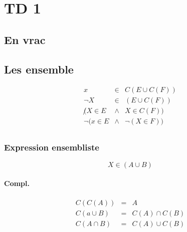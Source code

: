 \documentclass[12pt,a4paper,openany]{report}
\begin{document}
	\setcounter{tocdepth}{2}
	\setcounter{secnumdepth}{3}
	\maketitle
	\chapter{TD 1}
		\section{En vrac}
		\section{Les ensemble}
				\begin{eqnarray*}
					x &\in& C(E \cup C(F))\\
					\neg X &\in&(E\cup C(F))\\
					\not(X \in E &\wedge& X \in C(F))\\
					\neg(x \in E &\wedge& \neg (X \in F))\\
				\end{eqnarray*}
		
			

	\subsection{Expression ensembliste}
	$$X \in (A \cup B)$$
	\subsubsection{Compl.}
	\begin{eqnarray*}
		C(C(A)) &=&A\\
		C(a\cup B) &=& C(A) \cap C(B)\\
		C(A \cap B) &=& C(A) \cup C(B)\\
	\end{eqnarray*}
\end{document}
